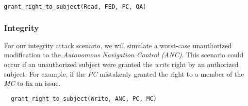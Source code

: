 \documentclass[10pt,journal,compsoc]{IEEEtran}
\begin{document}
\begin{lstlisting}
grant_right_to_subject(Read, FED, PC, QA)
\end{lstlisting}

\subsubsection{Integrity}

For our integrity attack scenario, we will simulate a worst-case unauthorized modification to the \textit{Autonomous Navigation Control (ANC)}. This scenario could occur if an unauthorized subject were granted the \textit{write} right by an authorized subject. For example, if the \textit{PC} mistakenly granted the right to a member of the \textit{MC} to fix an issue.

\begin{lstlisting}
  grant_right_to_subject(Write, ANC, PC, MC)
\end{lstlisting}




\end{document}
